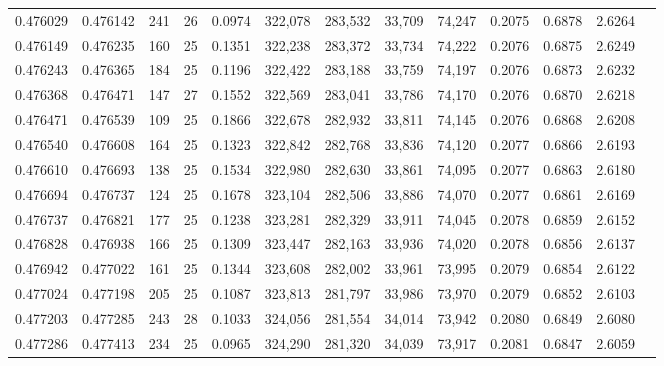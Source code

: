 \begin{tabular}{rrrrrrrrrrrrr}
0.476029 & 0.476142 & 241 &  26 &                                     0.0974 & 322,078 & 283,532 &  33,709 &  74,247 & 0.2075 & 0.6878 & 2.6264 \\
0.476149 & 0.476235 & 160 &  25 &                                     0.1351 & 322,238 & 283,372 &  33,734 &  74,222 & 0.2076 & 0.6875 & 2.6249 \\
0.476243 & 0.476365 & 184 &  25 &                                     0.1196 & 322,422 & 283,188 &  33,759 &  74,197 & 0.2076 & 0.6873 & 2.6232 \\
0.476368 & 0.476471 & 147 &  27 &                                     0.1552 & 322,569 & 283,041 &  33,786 &  74,170 & 0.2076 & 0.6870 & 2.6218 \\
0.476471 & 0.476539 & 109 &  25 &                                     0.1866 & 322,678 & 282,932 &  33,811 &  74,145 & 0.2076 & 0.6868 & 2.6208 \\
0.476540 & 0.476608 & 164 &  25 &                                     0.1323 & 322,842 & 282,768 &  33,836 &  74,120 & 0.2077 & 0.6866 & 2.6193 \\
0.476610 & 0.476693 & 138 &  25 &                                     0.1534 & 322,980 & 282,630 &  33,861 &  74,095 & 0.2077 & 0.6863 & 2.6180 \\
0.476694 & 0.476737 & 124 &  25 &                                     0.1678 & 323,104 & 282,506 &  33,886 &  74,070 & 0.2077 & 0.6861 & 2.6169 \\
0.476737 & 0.476821 & 177 &  25 &                                     0.1238 & 323,281 & 282,329 &  33,911 &  74,045 & 0.2078 & 0.6859 & 2.6152 \\
0.476828 & 0.476938 & 166 &  25 &                                     0.1309 & 323,447 & 282,163 &  33,936 &  74,020 & 0.2078 & 0.6856 & 2.6137 \\
0.476942 & 0.477022 & 161 &  25 &                                     0.1344 & 323,608 & 282,002 &  33,961 &  73,995 & 0.2079 & 0.6854 & 2.6122 \\
0.477024 & 0.477198 & 205 &  25 &                                     0.1087 & 323,813 & 281,797 &  33,986 &  73,970 & 0.2079 & 0.6852 & 2.6103 \\
0.477203 & 0.477285 & 243 &  28 &                                     0.1033 & 324,056 & 281,554 &  34,014 &  73,942 & 0.2080 & 0.6849 & 2.6080 \\
0.477286 & 0.477413 & 234 &  25 &                                     0.0965 & 324,290 & 281,320 &  34,039 &  73,917 & 0.2081 & 0.6847 & 2.6059 \\

\end{tabular}
